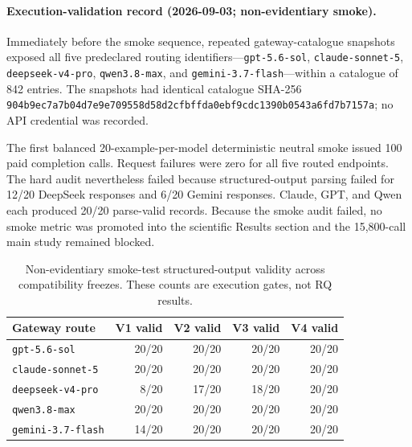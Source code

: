 
\paragraph{Execution-validation record (2026-09-03; non-evidentiary smoke).}
Immediately before the smoke sequence, repeated gateway-catalogue snapshots exposed all five predeclared routing identifiers---\texttt{gpt-5.6-sol}, \texttt{claude-sonnet-5}, \texttt{deepseek-v4-pro}, \texttt{qwen3.8-max}, and \texttt{gemini-3.7-flash}---within a catalogue of 842 entries. The snapshots had identical catalogue SHA-256 \texttt{904b9ec7a7b04d7e9e709558d58d2cfbffda0ebf9cdc1390b0543a6fd7b7157a}; no API credential was recorded.

The first balanced 20-example-per-model deterministic neutral smoke issued 100 paid completion calls. Request failures were zero for all five routed endpoints. The hard audit nevertheless failed because structured-output parsing failed for 12/20 DeepSeek responses and 6/20 Gemini responses. Claude, GPT, and Qwen each produced 20/20 parse-valid records. Because the smoke audit failed, no smoke metric was promoted into the scientific Results section and the 15,800-call main study remained blocked.

\begin{table}[t]
\centering
\small
\begin{tabular}{@{}lrrrr@{}}
\toprule
Gateway route & V1 valid & V2 valid & V3 valid & V4 valid \\
\midrule
\texttt{gpt-5.6-sol} & 20/20 & 20/20 & 20/20 & 20/20 \\
\texttt{claude-sonnet-5} & 20/20 & 20/20 & 20/20 & 20/20 \\
\texttt{deepseek-v4-pro} & 8/20 & 17/20 & 18/20 & 20/20 \\
\texttt{qwen3.8-max} & 20/20 & 20/20 & 20/20 & 20/20 \\
\texttt{gemini-3.7-flash} & 14/20 & 20/20 & 20/20 & 20/20 \\
\bottomrule
\end{tabular}
\caption{Non-evidentiary smoke-test structured-output validity across compatibility freezes. These counts are execution gates, not RQ results.}
\label{tab:smoke-execution-validation}
\end{table}

